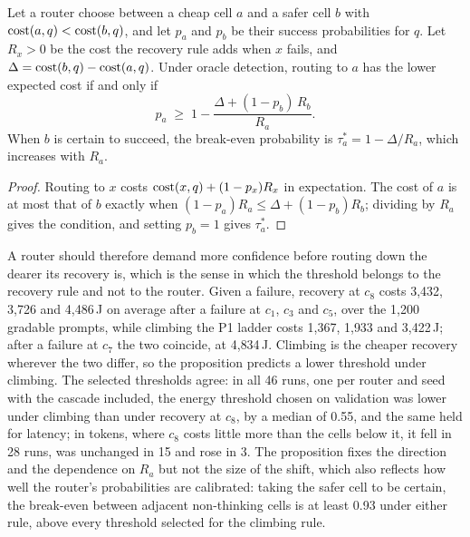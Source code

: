 \begin{proposition}
\label{prop:tau}
Let a router choose between a cheap cell $a$ and a safer cell $b$ with
$\mathrm{cost}(a, q) < \mathrm{cost}(b, q)$, and let $p_a$ and $p_b$ be their success
probabilities for $q$. Let $R_x > 0$ be the cost the recovery rule adds when
$x$ fails, and $\Delta = \mathrm{cost}(b, q) - \mathrm{cost}(a, q)$. Under oracle detection,
routing to $a$ has the lower expected cost if and only if
\[
  p_a \;\geq\; 1 - \frac{\Delta + (1 - p_b)\,R_b}{R_a}.
\]
When $b$ is certain to succeed, the break-even probability is
$\tau^{*}_a = 1 - \Delta / R_a$, which increases with $R_a$.
\end{proposition}
\begin{proof}
Routing to $x$ costs $\mathrm{cost}(x, q) + (1 - p_x) R_x$ in expectation. The cost of
$a$ is at most that of $b$ exactly when
$(1 - p_a) R_a \leq \Delta + (1 - p_b) R_b$; dividing by $R_a$ gives the
condition, and setting $p_b = 1$ gives $\tau^{*}_a$.
\end{proof}
A router should therefore demand more confidence before routing down the
dearer its recovery is, which is the sense in which the threshold belongs to
the recovery rule and not to the router. Given a failure, recovery at $c_8$
costs 3{,}432, 3{,}726 and 4{,}486\,J on average after a failure at $c_1$,
$c_3$ and $c_5$, over the 1{,}200 gradable prompts, while climbing the P1
ladder costs 1{,}367, 1{,}933 and 3{,}422\,J; after a failure at $c_7$ the two
coincide, at 4{,}834\,J. Climbing is the cheaper recovery wherever the two
differ, so the proposition predicts a lower threshold under climbing. The
selected thresholds agree: in all 46 runs, one per router and seed with the
cascade included, the energy threshold chosen on validation was lower under
climbing than under recovery at $c_8$, by a median of 0.55, and the same held
for latency; in tokens, where $c_8$ costs little more than the cells below it,
it fell in 28 runs, was unchanged in 15 and rose in 3. The proposition fixes
the direction and the dependence on $R_a$ but not the size of the shift, which
also reflects how well the router's probabilities are calibrated: taking the
safer cell to be certain, the break-even between adjacent non-thinking cells
is at least 0.93 under either rule, above every threshold selected for the
climbing rule.

